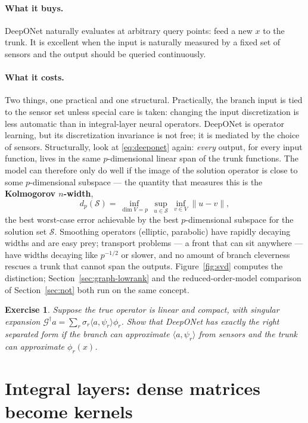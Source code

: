 \documentclass[10pt,a4paper]{article}
\newtheorem{exercise}{Exercise}
\newcommand{\G}{\mathcal{G}}
\begin{document}
\paragraph{What it buys.}
DeepONet naturally evaluates at arbitrary query points: feed a new $x$ to the
trunk. It is excellent when the input is naturally measured by a fixed set of
sensors and the output should be queried continuously.

\paragraph{What it costs.}
Two things, one practical and one structural. Practically, the branch input
is tied to the sensor set unless special care is taken: changing the input
discretization is less automatic than in integral-layer neural operators.
DeepONet is operator learning, but its discretization invariance is not
free; it is mediated by the choice of sensors. Structurally, look at
\eqref{eq:deeponet} again: \emph{every} output, for every input function,
lives in the same $p$-dimensional linear span of the trunk functions. The
model can therefore only do well if the image of the solution operator is
close to some $p$-dimensional subspace --- the quantity that measures this
is the \textbf{Kolmogorov $n$-width},
\[
  d_p(\mathcal{S}) = \inf_{\dim V = p}\, \sup_{u \in \mathcal{S}}\,
  \inf_{v \in V} \|u - v\|,
\]
the best worst-case error achievable by the best $p$-dimensional subspace
for the solution set $\mathcal{S}$. Smoothing operators (elliptic,
parabolic) have rapidly decaying widths and are easy prey; transport
problems --- a front that can sit anywhere --- have widths decaying like
$p^{-1/2}$ or slower, and no amount of branch cleverness rescues a trunk
that cannot span the outputs. Figure~\ref{fig:svd} computes the
distinction; Section~\ref{sec:graph-lowrank} and the reduced-order-model
comparison of Section~\ref{sec:not} both run on the same concept.

\begin{exercise}
Suppose the true operator is linear and compact, with singular expansion
$\G^\dagger a = \sum_r \sigma_r \langle a,\psi_r\rangle \phi_r$. Show that
DeepONet has exactly the right separated form if the branch can approximate
$\langle a,\psi_r\rangle$ from sensors and the trunk can approximate
$\phi_r(x)$.
\end{exercise}

\section{Integral layers: dense matrices become kernels}
\label{sec:integral}
\end{document}
